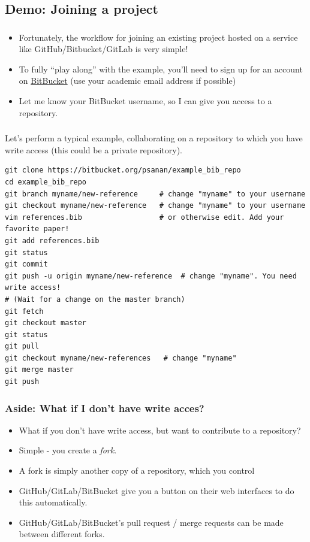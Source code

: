 \subsection{Demo: Joining a project}

\begin{frame}[fragile]
\frametitle{}
\begin{itemize}
\item Fortunately, the workflow for joining an existing project hosted on a service like GitHub/Bitbucket/GitLab is very simple!
\item To fully ``play along'' with the example, you'll need to sign up for an account on \href{bitbucket.org}{BitBucket} (use your academic email address if possible)
\item Let me know your BitBucket username, so I can give you access to a repository.
\end{itemize}
\end{frame}

\begin{frame}[fragile]
\frametitle{}
Let's perform a typical example, collaborating on a repository to which you have write access (this could be a private repository).
\begin{lstlisting}
git clone https://bitbucket.org/psanan/example_bib_repo
cd example_bib_repo
git branch myname/new-reference     # change "myname" to your username
git checkout myname/new-reference   # change "myname" to your username
vim references.bib                  # or otherwise edit. Add your favorite paper!
git add references.bib
git status
git commit
git push -u origin myname/new-reference  # change "myname". You need write access!
# (Wait for a change on the master branch)
git fetch
git checkout master
git status
git pull
git checkout myname/new-references   # change "myname"
git merge master
git push
\end{lstlisting}
\end{frame}

\begin{frame}[fragile]
\frametitle{Aside: What if I don't have write acces?}
\begin{itemize}
\item What if you don't have write access, but want to contribute to a repository?
\item Simple - you create a \emph{fork}.
\item A fork is simply another copy of a repository, which you control
\item GitHub/GitLab/BitBucket give you a button on their web interfaces to do this automatically.
\item GitHub/GitLab/BitBucket's pull request / merge requests can be made between different forks.
\end{itemize}
\end{frame}

